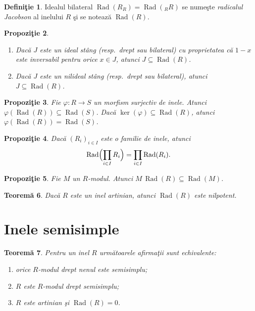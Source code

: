 \documentclass[12pt,a4paper]{book}
\DeclareMathOperator{\Rad}{Rad}
\theoremstyle{plain}
\newtheorem{theorem}{Teoremă}[section] %
\newtheorem{proposition}[theorem]{Propoziţie}
\theoremstyle{definition}
\newtheorem{definition}[theorem]{Definiţie}
\theoremstyle{remark}
\begin{document}
\begin{definition}
Idealul bilateral \(\Rad(R_R) = \Rad({}_R R)\) se numeşte
\emph{radicalul Jacobson} al inelului \(R\) şi se notează \(\Rad(R)\).
\end{definition}

\begin{proposition}
\leavevmode
\begin{enumerate}
  \item Dacă \(J\) este un ideal stâng (resp.\ drept sau bilateral) cu
        proprietatea că \(1-x\) este inversabil pentru orice \(x \in J\),
        atunci \(J \subseteq \Rad(R)\).
  \item Dacă \(J\) este un nilideal stâng (resp.\ drept sau bilateral),
        atunci \(J \subseteq \Rad(R)\).
\end{enumerate}
\end{proposition}

\begin{proposition}
Fie \(\varphi : R \to S\) un morfism surjectiv de inele.
Atunci \(\varphi(\Rad(R)) \subseteq \Rad(S)\). Dacă \(\ker(\varphi)
\subseteq \Rad(R)\), atunci \(\varphi(\Rad(R)) = \Rad(S)\).
\end{proposition}

\begin{proposition}
Dacă \((R_i)_{i\in I}\) este o familie de inele, atunci
\[
  \Rad\Bigl(\prod_{i\in I} R_i\Bigr) = \prod_{i\in I} \Rad(R_i).
\]
\end{proposition}

\begin{proposition}
Fie \(M\) un \(R\)-modul. Atunci \(M\,\Rad(R) \subseteq \Rad(M)\).
\end{proposition}

\begin{theorem}
Dacă \(R\) este un inel artinian, atunci \(\Rad(R)\) este nilpotent.
\end{theorem}

\section{Inele semisimple}

\begin{theorem}
Pentru un inel \(R\) următoarele afirmaţii sunt echivalente:
\begin{enumerate}
  \item orice \(R\)-modul drept nenul este semisimplu;
  \item \(R\) este \(R\)-modul drept semisimplu;
  \item \(R\) este artinian şi \(\Rad(R)=0\).
\end{enumerate}
\end{theorem}
\end{document}
